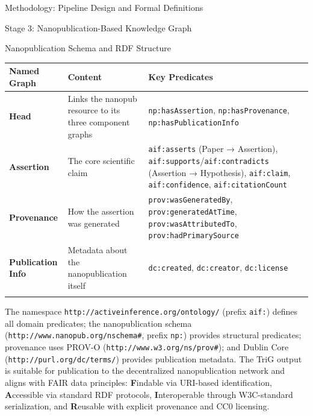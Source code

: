 \documentclass[
  ignorenonframetext,
]{beamer}
\newcounter{none} %
\begin{document}
\begin{frame}[fragile]{Methodology: Pipeline Design and Formal
Definitions}
\begin{block}{Stage 3: Nanopublication-Based Knowledge Graph}
\begin{block}{Nanopublication Schema and RDF Structure}
{\def\LTcaptype{none} %
\begin{longtable}[]{@{}
  >{\raggedright\arraybackslash}p{}
  >{\raggedright\arraybackslash}p{}
  >{\raggedright\arraybackslash}p{}@{}}
\toprule\noalign{}
\begin{minipage}[b]{\linewidth}\raggedright
Named Graph
\end{minipage} & \begin{minipage}[b]{\linewidth}\raggedright
Content
\end{minipage} & \begin{minipage}[b]{\linewidth}\raggedright
Key Predicates
\end{minipage} \\
\midrule\noalign{}
\endhead
\textbf{Head} & Links the nanopub resource to its three component graphs
& \texttt{np:hasAssertion}, \texttt{np:hasProvenance},
\texttt{np:hasPublicationInfo} \\
\textbf{Assertion} & The core scientific claim & \texttt{aif:asserts}
(Paper → Assertion), \texttt{aif:supports}/\texttt{aif:contradicts}
(Assertion → Hypothesis), \texttt{aif:claim}, \texttt{aif:confidence},
\texttt{aif:citationCount} \\
\textbf{Provenance} & How the assertion was generated &
\texttt{prov:wasGeneratedBy}, \texttt{prov:generatedAtTime},
\texttt{prov:wasAttributedTo}, \texttt{prov:hadPrimarySource} \\
\textbf{Publication Info} & Metadata about the nanopublication itself &
\texttt{dc:created}, \texttt{dc:creator}, \texttt{dc:license} \\
\bottomrule\noalign{}
\end{longtable}
}

The namespace \texttt{http://activeinference.org/ontology/} (prefix
\texttt{aif:}) defines all domain predicates; the nanopublication schema
(\texttt{http://www.nanopub.org/nschema\#}, prefix \texttt{np:})
provides structural predicates; provenance uses PROV-O
(\texttt{http://www.w3.org/ns/prov\#}); and Dublin Core
(\texttt{http://purl.org/dc/terms/}) provides publication metadata. The
TriG output is suitable for publication to the decentralized
nanopublication network and aligns with FAIR data principles:
\textbf{F}indable via URI-based identification, \textbf{A}ccessible via
standard RDF protocols, \textbf{I}nteroperable through W3C-standard
serialization, and \textbf{R}eusable with explicit provenance and CC0
licensing.
\end{block}


\end{block}
\end{frame}
\end{document}
